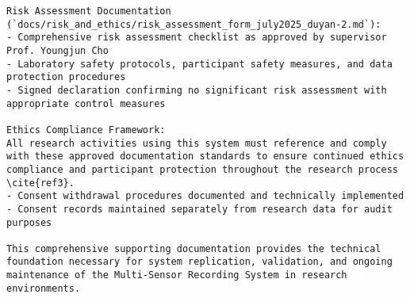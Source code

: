 \begin{verbatim}
Risk Assessment Documentation (`docs/risk_and_ethics/risk_assessment_form_july2025_duyan-2.md`):
- Comprehensive risk assessment checklist as approved by supervisor Prof. Youngjun Cho
- Laboratory safety protocols, participant safety measures, and data protection procedures
- Signed declaration confirming no significant risk assessment with appropriate control measures

Ethics Compliance Framework:
All research activities using this system must reference and comply with these approved documentation standards to ensure continued ethics compliance and participant protection throughout the research process \cite{ref3}.
- Consent withdrawal procedures documented and technically implemented
- Consent records maintained separately from research data for audit purposes

This comprehensive supporting documentation provides the technical foundation necessary for system replication, validation, and ongoing maintenance of the Multi-Sensor Recording System in research environments.
\end{verbatim}
